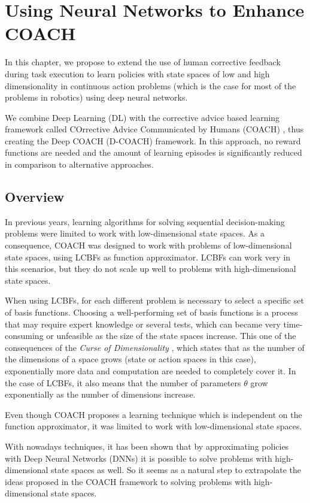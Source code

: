 \chapter{Using Neural Networks to Enhance COACH}
In this chapter, we propose to extend the use of human corrective feedback during task execution to learn policies with state spaces of low and high dimensionality in continuous action problems (which is the case for most of the problems in robotics) using deep neural networks.

We combine Deep Learning (DL) with the corrective advice based learning framework called COrrective Advice Communicated by Humans (COACH) \cite{Celemin2018AnInteractive}, thus creating the Deep COACH (D-COACH) framework. In this approach, no reward functions are needed and the amount of learning episodes is significantly reduced in comparison to alternative approaches.

\section{Overview}
In previous years, learning algorithms for solving sequential decision-making problems were limited to work with low-dimensional state spaces. As a consequence, COACH was designed to work with problems of low-dimensional state spaces, using LCBFs as function approximator. LCBFs can work very in this scenarios, but they do not scale up well to problems with high-dimensional state spaces. 

When using LCBFs, for each different problem is necessary to select a specific set of basis functions. Choosing a well-performing set of basis functions is a process that may require expert knowledge or several tests, which can became very time-consuming or unfeasible as the size of the state spaces increase. This one of the consequences of the \emph{Curse of Dimensionality} \cite{Bellman1957}, which states that as the number of the dimensions of a space grows (state or action spaces in this case), exponentially more data and computation are needed to completely cover it. In the case of LCBFs, it also means that the number of parameters $\theta$ grow exponentially as the number of dimensions increase. 

Even though COACH proposes a learning technique which is independent on the function approximator, it was limited to work with low-dimensional state spaces. 

With nowadays techniques, it has been shown that by approximating policies with Deep Neural Networks (DNNs) it is possible to solve problems with high-dimensional state spaces as well. So it seems as a natural step to extrapolate the ideas proposed in the COACH framework to solving problems with high-dimensional state spaces. 


